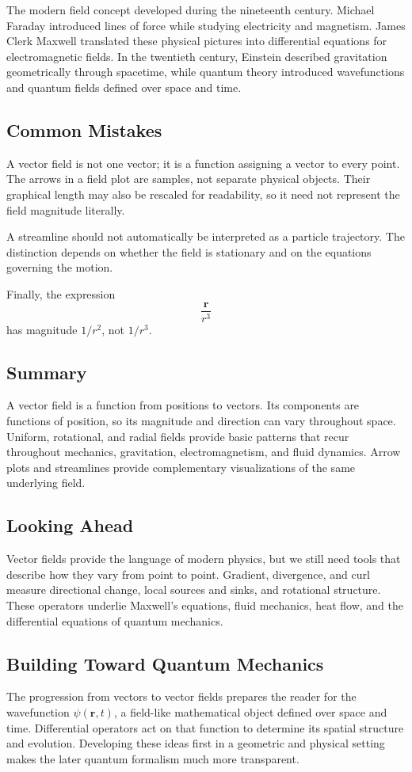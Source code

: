 
The modern field concept developed during the nineteenth century. Michael
Faraday introduced lines of force while studying electricity and magnetism.
James Clerk Maxwell translated these physical pictures into differential
equations for electromagnetic fields. In the twentieth century, Einstein
described gravitation geometrically through spacetime, while quantum theory
introduced wavefunctions and quantum fields defined over space and time.

\subsection{Common Mistakes}

A vector field is not one vector; it is a function assigning a vector to every
point. The arrows in a field plot are samples, not separate physical objects.
Their graphical length may also be rescaled for readability, so it need not
represent the field magnitude literally.

A streamline should not automatically be interpreted as a particle trajectory.
The distinction depends on whether the field is stationary and on the equations
governing the motion.

Finally, the expression
\[
\frac{\mathbf r}{r^3}
\]
has magnitude $1/r^2$, not $1/r^3$.

\subsection{Summary}

A vector field is a function from positions to vectors. Its components are
functions of position, so its magnitude and direction can vary throughout
space. Uniform, rotational, and radial fields provide basic patterns that recur
throughout mechanics, gravitation, electromagnetism, and fluid dynamics.
Arrow plots and streamlines provide complementary visualizations of the same
underlying field.

\subsection*{Looking Ahead}

Vector fields provide the language of modern physics, but we still need tools
that describe how they vary from point to point. Gradient, divergence, and curl
measure directional change, local sources and sinks, and rotational structure.
These operators underlie Maxwell's equations, fluid mechanics, heat flow, and
the differential equations of quantum mechanics.

\subsection*{Building Toward Quantum Mechanics}

The progression from vectors to vector fields prepares the reader for the
wavefunction $\psi(\mathbf r,t)$, a field-like mathematical object defined over
space and time. Differential operators act on that function to determine its
spatial structure and evolution. Developing these ideas first in a geometric
and physical setting makes the later quantum formalism much more transparent.
